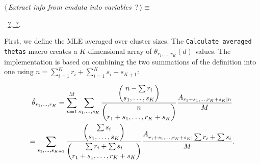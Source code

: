 \documentclass[reqno]{amsart}
\renewcommand{\NWtarget}[2]{\hypertarget{#1}{#2}}
\renewcommand{\NWlink}[2]{\hyperlink{#1}{#2}}
\providecommand{\tsum}{\textstyle\sum}
\newcommand{\thetar}[1]{\theta_{r_1,\ldots,r_{#1}}}
\newcommand{\hthetar}[1]{\hat{\theta}_{r_1,\ldots,r_{#1}}}
\begin{document}
\begin{flushleft} \small
\begin{minipage}{\linewidth}\label{scrap3}\raggedright\small
\NWtarget{nuweb?}{} $\langle\,${\itshape Extract info from cmdata into variables}\nobreak\ {\footnotesize {?}}$\,\rangle\equiv$
\vspace{-1ex}
\vspace{-1.5ex}
\footnotesize
\begin{list}{}{\setlength{\itemsep}{-\parsep}\setlength{\itemindent}{-\leftmargin}}
\item \NWtxtMacroRefIn\ \NWlink{nuweb?}{?}\NWlink{nuweb?}{, ?}.

\item{}
\end{list}
\end{minipage}\vspace{4ex}
\end{flushleft}
First, we define the MLE averaged over cluster sizes. The \texttt{Calculate averaged thetas} macro
creates a $K$-dimensional array of $\thetar{K}(d)$ values.  
The implementation is based on combining the two summations
of the definition into one using $n=\sum_{i=1}^K r_i + \sum_{i=1}^K s_i + s_{K+1}$:

\begin{multline} 
\hthetar{K}=\sum_{n=1}^M\sum_{s_1,\ldots,s_{K}}\frac{\dbinom{n-\tsum{r_i}}{s_1,\ldots,s_{K}}}%
  {\dbinom{n}{r_1+s_1,\ldots,r_K+s_{K}}}\frac{A_{r_1+s_1,\ldots,r_K+s_K|n}}{M} \\
  = \sum_{s_1,\ldots,s_{K+1}}\frac{\dbinom{\tsum{s_i}}{s_1,\ldots,s_{K}}}%
  {\dbinom{\tsum r_i + \tsum{s_i}}{r_1+s_1,\ldots,r_K+s_{K}}}\frac{A_{r_1+s_1,\ldots,r_K+s_K|\tsum r_i + \tsum{s_i}}}{M}.
\end{multline}%
\end{document}
